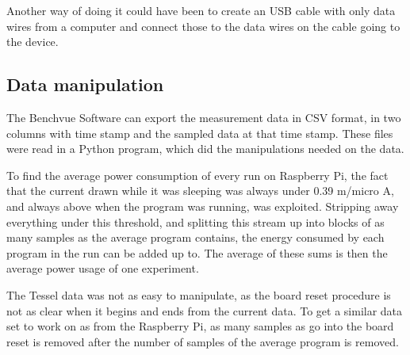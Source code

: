 Another way of doing it could have been to create an USB cable with only data wires from a computer and connect those to the data wires on the cable going to the device. 


\subsection{Data manipulation}
The Benchvue Software can export the measurement data in CSV format, in two columns with time stamp and the sampled data at that time stamp.
These files were read in a Python program, which did the manipulations needed on the data.

To find the average power consumption of every run on Raspberry Pi, the fact that the current drawn while it was sleeping was always under 0.39 m/micro A, and always above when the program was running, was exploited. 
Stripping away everything under this threshold, and splitting this stream up into blocks of as many samples as the average program contains, the energy consumed by each program in the run can be added up to. 
The average of these sums is then the average power usage of one experiment.

The Tessel data was not as easy to manipulate, as the board reset procedure is not as clear when it begins and ends from the current data. To get a similar data set to work on as from the Raspberry Pi, as many samples as go into the board reset is removed after the number of samples of the average program is removed.

